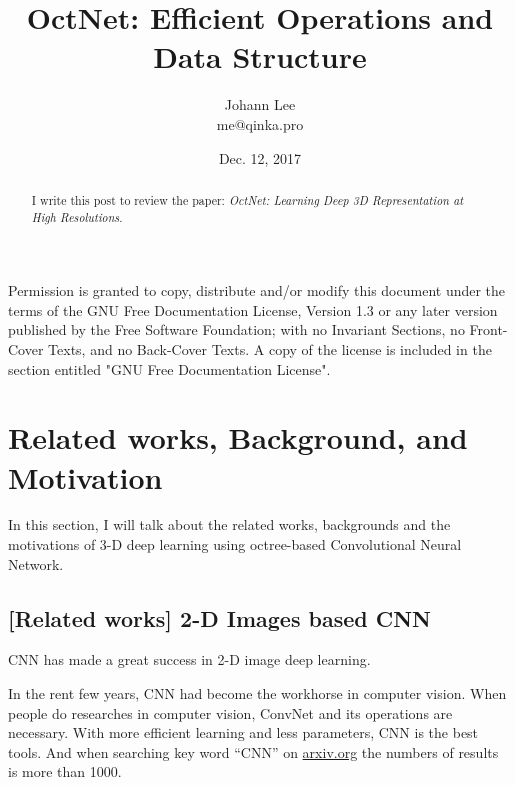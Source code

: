 \documentclass[border=0.5in]{blog}
\title{OctNet: Efficient Operations and Data Structure}
\author{Johann Lee \\ me@qinka.pro}
\date{Dec. 12, 2017}
\begin{document}
    \maketitle
    \begin{abstract}
        I write this post to review the paper:
        \citep{DBLP:journals/corr/RieglerUG16}\textit{OctNet: Learning Deep 3D Representation at High Resolutions}.
    \end{abstract}

    \begin{license}
        
        \par Permission is granted to copy, distribute and/or modify this document
        under the terms of the GNU Free Documentation License, Version 1.3
        or any later version published by the Free Software Foundation;
        with no Invariant Sections, no Front-Cover Texts, and no Back-Cover Texts.
        A copy of the license is included in the section entitled "GNU
        Free Documentation License".
    \end{license}

    \tableofcontents

    \section{Related works, Background, and Motivation}
    \label{sec:rbm}
    
    In this section, I will talk about the related works, backgrounds and the motivations of 3-D deep learning using octree-based Convolutional Neural Network.\citep{DBLP:journals/corr/RieglerUG16}
    
    \subsection{[Related works] 2-D Images based CNN}
    \label{sec:rbm:2dcnn}
    
    CNN has made a great success in 2-D image deep learning.
    
    In the rent few years, CNN had become the workhorse in computer vision.
    When people do researches in computer vision, ConvNet and its operations
    are necessary. With more efficient learning and less parameters,
    CNN is the best tools.
    And when searching key word ``CNN'' on \url{arxiv.org} the numbers of results 
    is more than 1000.
    
    \paragraph{\citep{DBLP:journals/corr/FlynnNPS15}}
    
\end{document}

